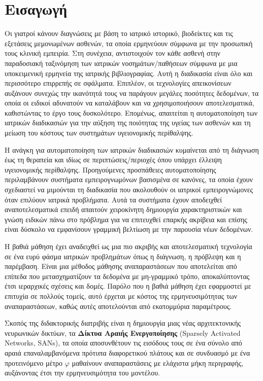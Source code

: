 \chapter{Εισαγωγή}
\label{chapter1}
Οι γιατροί κάνουν διαγνώσεις με βάση το ιατρικό ιστορικό, βιοδείκτες και τις εξετάσεις μεμονωμένων ασθενών, τα οποία ερμηνεύουν σύμφωνα με την προσωπική τους κλινική εμπειρία.
Στη συνέχεια, αντιστοιχούν τον κάθε ασθενή στην παραδοσιακή ταξινόμηση των ιατρικών νοσημάτων/παθήσεων σύμφωνα με μια υποκειμενική ερμηνεία της ιατρικής βιβλιογραφίας.
Αυτή η διαδικασία είναι όλο και περισσότερο επιρρεπής σε σφάλματα.
Επιπλέον, οι τεχνολογίες απεικονίσεων αυξάνουν συνεχώς την ικανότητά τους να παράγουν μεγάλες ποσότητες δεδομένων, τα οποία οι ειδικοί αδυνατούν να καταλάβουν και να χρησιμοποιήσουν αποτελεσματικά, καθιστώντας το έργο τους δυσκολότερο.
Επομένως, απαιτείται η αυτοματοποίηση των ιατρικών διαδικασιών για την αύξηση της ποιότητας της υγείας των ασθενών και τη μείωση του κόστους των συστημάτων υγειονομικής περίθαλψης.

Η ανάγκη για αυτοματοποίηση των ιατρικών διαδικασιών κυμαίνεται από τη διάγνωση έως τη θεραπεία και ιδίως σε περιπτώσεις/περιοχές όπου υπάρχει έλλειψη υγειονομικής περίθαλψης.
Προηγούμενες προσπάθειες αυτοματοποίησης περιλαμβάνουν συστήματα εμπειρογνωμόνων βασισμένα σε κανόνες, τα οποία έχουν σχεδιαστεί να μιμούνται τη διαδικασία που ακολουθούν οι ιατρικοί εμπειρογνώμονες όταν επιλύουν ιατρικά προβλήματα.
Αυτά τα συστήματα έχουν αποδειχθεί αναποτελεσματικά επειδή απαιτούν χειροκίνητη δημιουργία χαρακτηριστικών και γνώση ειδικών πάνω στο πρόβλημα για να επιτευχθεί επαρκής ακρίβεια και επίσης είναι δύσκολο να εμφανίσουν γραμμική βελτίωση με την παρουσία νέων δεδομένων.

Η βαθιά μάθηση έχει αναδειχθεί ως μια πιο ακριβής και αποτελεσματική τεχνολογία σε ένα ευρύ φάσμα ιατρικών προβλημάτων όπως η διάγνωση, η πρόβλεψη και η παρέμβαση.
Είναι μια μέθοδος μάθησης αναπαραστάσεων που αποτελείται από επίπεδα που μετασχηματίζουν τα δεδομένα με μη-γραμμικό τρόπο, αποκαλύπτοντας έτσι ιεραρχικές σχέσεις και δομές.
Παρόλο που η βαθιά μάθηση έχει εφαρμοστεί με επιτυχία σε πολλούς τομείς, αυτό έρχεται με κόστος της ερμηνευσιμότητας των αναπαραστάσεων, καθώς αυτές αποτελούνται από εκατομμύρια παραμέτρους.

Σκοπός της διδακτορικής διατριβής είναι η δημιουργία μιας νέας αρχιτεκτονικής νευρωνικών δικτύων, τα \textbf{Δίκτυα Αραιής Ενεργοποίησης} (Sparsely Activated Networks, SANs), τα οποία αποσυνθέτουν τις εισόδους τους σε ένα σύνολο από αραιά επαναλαμβανόμενα πρότυπα διαφορετικού πλάτους και σε συνδυασμό με ένα προτεινόμενο μέτρο $\varphi$ μαθαίνουν αναπαραστάσεις με ελάχιστα μήκη περιγραφής, αυξάνοντας έτσι την ερμηνευσιμότητα του μοντέλου.

